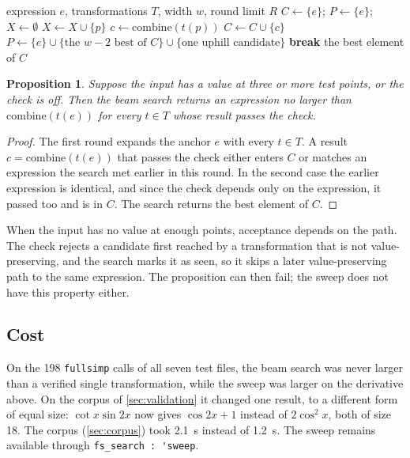 \documentclass[11pt]{amsart}
\newcommand{\mx}{\lstinline[style=mx]}
\newtheorem{proposition}{Proposition}[section]
\theoremstyle{definition}
\theoremstyle{remark}
\begin{document}
\begin{algorithm}[ht]
\caption{Beam search}\label{alg:beam}
\begin{algorithmic}[1]
\Require expression $e$, transformations $T$, width $w$, round limit $R$
\State $C \gets \{e\}$; $P \gets \{e\}$; $X \gets \emptyset$ 
    \State $X \gets X \cup \{p\}$
      \State $c \gets \mathrm{combine}(t(p))$
       $C \gets C \cup \{c\}$ \EndIf
    \EndFor
  \EndFor
  \State $P \gets \{e\} \cup \{\text{the $w-2$ best of } C\} \cup \{\text{one uphill candidate}\}$ 
   \textbf{break} \EndIf
\EndFor
\State \Return the best element of $C$
\end{algorithmic}
\end{algorithm}

\begin{proposition}\label{prop:single}
Suppose the input has a value at three or more test points, or the check is
off. Then the beam search returns an expression no larger than
$\mathrm{combine}(t(e))$ for every $t \in T$ whose result passes the check.
\end{proposition}

\begin{proof}
The first round expands the anchor $e$ with every $t \in T$. A result
$c = \mathrm{combine}(t(e))$ that passes the check either enters $C$ or
matches an expression the search met earlier in this round. In the second
case the earlier expression is identical, and since the check depends only
on the expression, it passed too and is in $C$. The search returns the best
element of $C$.
\end{proof}

When the input has no value at enough points, acceptance depends on the
path. The check rejects a candidate first reached by a transformation that
is not value-preserving, and the search marks it as seen, so it skips a
later value-preserving path to the same expression. The proposition can
then fail; the sweep does not have this property either.

\subsection{Cost}

On the 198 \mx|fullsimp| calls of all seven test files, the beam search was
never larger than a verified single transformation, while the sweep was
larger on the derivative above. On the corpus of \cref{sec:validation} it
changed one result, to a different form of equal size:
$\cot x \sin 2x$ now gives $\cos 2x + 1$ instead of $2\cos^2 x$, both of
size 18. The corpus (\cref{sec:corpus}) took 2.1~s instead of 1.2~s. The sweep remains
available through \mx|fs_search : 'sweep|.
\end{document}
